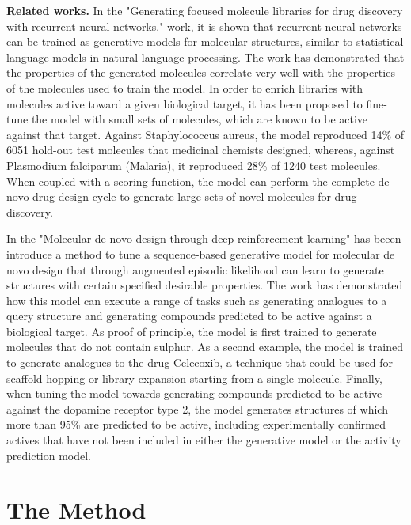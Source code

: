 \documentclass[a4paper]{article}
\newcommand{\mypar}[1]{{\bf #1.}}
\begin{document}
\mypar{Related works} 
In the "Generating focused molecule libraries for drug discovery with recurrent neural networks." \cite{generating-focused-molecule} work, it is shown that recurrent neural networks can be trained as generative models for molecular structures, similar to statistical language models in natural language processing. The work has demonstrated that the properties of the generated molecules correlate very well with the properties of the molecules used to train the model. In order to enrich libraries with molecules active toward a given biological target, it has been proposed to fine-tune the model with small sets of molecules, which are known to be active against that target. Against Staphylococcus aureus, the model reproduced 14\% of 6051 hold-out test molecules that medicinal chemists designed, whereas, against Plasmodium falciparum (Malaria), it reproduced 28\% of 1240 test molecules. When coupled with a scoring function, the model can perform the complete de novo drug design cycle to generate large sets of novel molecules for drug discovery. 



In the "Molecular de novo design through deep reinforcement learning" \cite{molecular-denovo-design} has beeen introduce a method to tune a sequence-based generative model for molecular de novo design that through augmented episodic likelihood can learn to generate structures with certain specified desirable properties. The work has demonstrated how this model can execute a range of tasks such as generating analogues to a query structure and generating compounds predicted to be active against a biological target. As proof of principle, the model is first trained to generate molecules that do not contain sulphur. As a second example, the model is trained to generate analogues to the drug Celecoxib, a technique that could be used for scaffold hopping or library expansion starting from a single molecule. Finally, when tuning the model towards generating compounds predicted to be active against the dopamine receptor type 2, the model generates structures of which more than 95\% are predicted to be active, including experimentally confirmed actives that have not been included in either the generative model or the activity prediction model.

\section{The Method}\label{sec:The Method}
\end{document}
